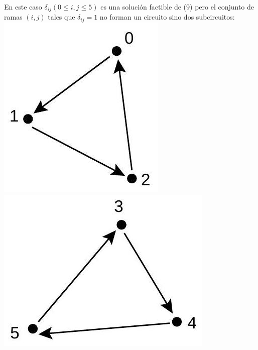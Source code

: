 \documentclass[10pt]{article}
\begin{document}
En este caso $\delta_{i j}(0 \leq i, j \leq 5)$ es una solución factible de (9) pero el conjunto de ramas $(i, j)$ tales que $\delta_{i j}=1$ no forman un circuito sino dos subcircuitos:\\
\includegraphics[max width=\textwidth, center]{2025_09_05_458e5b1ce89abceb5d44g-09(1)}\\
\includegraphics[max width=\textwidth, center]{2025_09_05_458e5b1ce89abceb5d44g-09}
\end{document}
